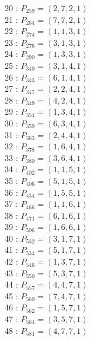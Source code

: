 \documentclass{article}
\begin{document}
{\begin{multicols}{2}
20 : $P_{259}=( 2, 7, 2, 1 )$\\
21 : $P_{264}=( 7, 7, 2, 1 )$\\
22 : $P_{274}=( 1, 1, 3, 1 )$\\
23 : $P_{276}=( 3, 1, 3, 1 )$\\
24 : $P_{290}=( 1, 3, 3, 1 )$\\
25 : $P_{340}=( 3, 1, 4, 1 )$\\
26 : $P_{343}=( 6, 1, 4, 1 )$\\
27 : $P_{347}=( 2, 2, 4, 1 )$\\
28 : $P_{349}=( 4, 2, 4, 1 )$\\
29 : $P_{354}=( 1, 3, 4, 1 )$\\
30 : $P_{359}=( 6, 3, 4, 1 )$\\
31 : $P_{363}=( 2, 4, 4, 1 )$\\
32 : $P_{378}=( 1, 6, 4, 1 )$\\
33 : $P_{380}=( 3, 6, 4, 1 )$\\
34 : $P_{402}=( 1, 1, 5, 1 )$\\
35 : $P_{406}=( 5, 1, 5, 1 )$\\
36 : $P_{434}=( 1, 5, 5, 1 )$\\
37 : $P_{466}=( 1, 1, 6, 1 )$\\
38 : $P_{471}=( 6, 1, 6, 1 )$\\
39 : $P_{506}=( 1, 6, 6, 1 )$\\
40 : $P_{532}=( 3, 1, 7, 1 )$\\
41 : $P_{534}=( 5, 1, 7, 1 )$\\
42 : $P_{546}=( 1, 3, 7, 1 )$\\
43 : $P_{550}=( 5, 3, 7, 1 )$\\
44 : $P_{557}=( 4, 4, 7, 1 )$\\
45 : $P_{560}=( 7, 4, 7, 1 )$\\
46 : $P_{562}=( 1, 5, 7, 1 )$\\
47 : $P_{564}=( 3, 5, 7, 1 )$\\
48 : $P_{581}=( 4, 7, 7, 1 )$\\
\end{multicols}
}
\end{document}
